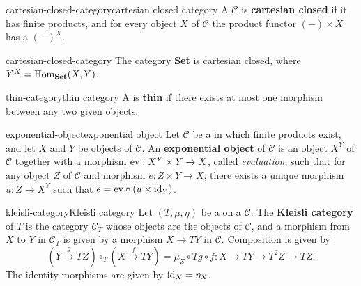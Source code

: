 \begin{topic}{cartesian-closed-category}{cartesian closed category}
    A  $\mathcal{C}$ is \textbf{cartesian closed} if it has finite products, and for every object $X$ of $\mathcal{C}$ the product functor $(-) \times X$ has a  $(-)^X$.
\end{topic}

\begin{example}{cartesian-closed-category}
    The category \textbf{Set} is cartesian closed, where $Y^X = \operatorname{Hom}_\textbf{Set}(X, Y)$.
\end{example}

\begin{topic}{thin-category}{thin category}
    A  is \textbf{thin} if there exists at most one morphism between any two given objects.
\end{topic}

\begin{topic}{exponential-object}{exponential object}
    Let $\mathcal{C}$ be a  in which finite products exist, and let $X$ and $Y$ be objects of $\mathcal{C}$. An \textbf{exponential object} of $\mathcal{C}$ is an object $X^Y$ of $\mathcal{C}$ together with a morphism $\textup{ev} : X^Y \times Y \to X$, called \textit{evaluation}, such that for any object $Z$ of $\mathcal{C}$ and morphism $e : Z \times Y \to X$, there exists a unique morphism $u : Z \to X^Y$ such that $e = \textup{ev} \circ (u \times \textup{id}_Y)$.
\end{topic}

\begin{topic}{kleisli-category}{Kleisli category}
    Let $(T, \mu, \eta)$ be a  on a  $\mathcal{C}$. The \textbf{Kleisli category} of $T$ is the category $\mathcal{C}_T$ whose objects are the objects of $\mathcal{C}$, and a morphism from $X$ to $Y$ in $\mathcal{C}_T$ is given by a morphism $X \to TY$ in $\mathcal{C}$. Composition is given by
    \[ (Y \xrightarrow{g} TZ) \circ_T (X \xrightarrow{f} TY) = \mu_Z \circ Tg \circ f : X \to TY \to T^2 Z \to TZ . \]
    The identity morphisms are given by $\textup{id}_X = \eta_X$.
\end{topic}

